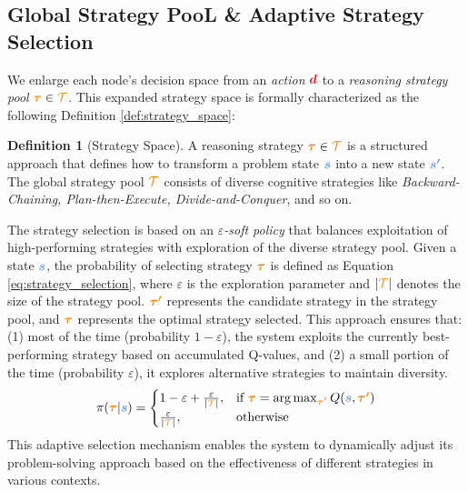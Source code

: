 \documentclass{article} %
\theoremstyle{definition}
\newtheorem{definition}{Definition}[section]
\theoremstyle{remark}
\begin{document}
\subsection{Global Strategy PooL \& Adaptive Strategy Selection}


We enlarge each node's decision space from an \emph{action} $\textcolor{red}{\boldsymbol{d}}$ to a \emph{reasoning strategy pool} $\textcolor{orange}{\boldsymbol{\tau}} \in \textcolor{orange}{\mathcal{T}}$. This expanded strategy space is formally characterized as the following Definition \autoref{def:strategy_space}:

\begin{definition}[Strategy Space]
\label{def:strategy_space}
A reasoning strategy $\textcolor{orange}{\boldsymbol{\tau}} \in \textcolor{orange}{\mathcal{T}}$ is a structured approach that defines how to transform a problem state $\textcolor{lightblue}{\boldsymbol{s}}$ into a new state $\textcolor{lightblue}{\boldsymbol{s'}}$. The global strategy pool $\textcolor{orange}{\mathcal{T}}$ consists of diverse cognitive strategies like \textit{Backward-Chaining, Plan-then-Execute, Divide-and-Conquer}, and so on.
\end{definition}


The strategy selection is based on an \textit{$\varepsilon$-soft policy} that balances exploitation of high-performing strategies with exploration of the diverse strategy pool. Given a state $\textcolor{lightblue}{\boldsymbol{s}}$, the probability of selecting strategy $\textcolor{orange}{\boldsymbol{\tau}}$ is defined as Equation \ref{eq:strategy_selection}, where $\varepsilon$ is the exploration parameter and $|\textcolor{orange}{\mathcal{T}}|$ denotes the size of the strategy pool. $\textcolor{orange}{\boldsymbol{\tau'}}$ represents the candidate strategy in the strategy pool, and $\textcolor{orange}{\boldsymbol{\tau}}$ represents the optimal strategy selected. This approach ensures that: (1) most of the time (probability $1-\varepsilon$), the system exploits the currently best-performing strategy based on accumulated Q-values, and (2) a small portion of the time (probability $\varepsilon$), it explores alternative strategies to maintain diversity. 
\begin{equation}
\label{eq:strategy_selection}
\pi(\textcolor{orange}{\boldsymbol{\tau}}|\textcolor{lightblue}{\boldsymbol{s}}) = \begin{cases}
1 - \varepsilon + \frac{\varepsilon}{|\textcolor{orange}{\mathcal{T}}|}, & \text{if } \textcolor{orange}{\boldsymbol{\tau}} = \arg\max_{\textcolor{orange}{\boldsymbol{\tau'}}} Q(\textcolor{lightblue}{\boldsymbol{s}}, \textcolor{orange}{\boldsymbol{\tau'}}) \\
\frac{\varepsilon}{|\textcolor{orange}{\mathcal{T}}|}, & \text{otherwise}
\end{cases}
\end{equation}
This adaptive selection mechanism enables the system to dynamically adjust its problem-solving approach based on the effectiveness of different strategies in various contexts.
\end{document}
